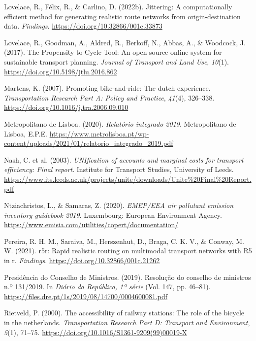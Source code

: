 \documentclass[review, doubleblind, 3p,
authoryear]{elsarticle} %
\newlength{\cslhangindent}
\newlength{\cslentryspacingunit} %
\newenvironment{CSLReferences}[2] %
 {%
  \setlength{\parindent}{0pt}
  \ifodd #1
  \let\oldpar\par
  \def\par{\hangindent=\cslhangindent\oldpar}
  \fi
  \setlength{\parskip}{#2\cslentryspacingunit}
 }%
 {}
\begin{document}
\begin{CSLReferences}{1}{0}
\leavevmode{}%
Lovelace, R., Félix, R., \& Carlino, D. (2022b). Jittering: A
computationally efficient method for generating realistic route networks
from origin-destination data. \emph{Findings}.
\url{https://doi.org/10.32866/001c.33873}

\leavevmode{}%
Lovelace, R., Goodman, A., Aldred, R., Berkoff, N., Abbas, A., \&
Woodcock, J. (2017). The Propensity to Cycle Tool: An open source online
system for sustainable transport planning. \emph{Journal of Transport
and Land Use}, \emph{10}(1). \url{https://doi.org/10.5198/jtlu.2016.862}

\leavevmode{}%
Martens, K. (2007). Promoting bike-and-ride: The dutch experience.
\emph{Transportation Research Part A: Policy and Practice},
\emph{41}(4), 326--338. \url{https://doi.org/10.1016/j.tra.2006.09.010}

\leavevmode{}%
Metropolitano de Lisboa. (2020). \emph{Relatório integrado 2019}.
{Metropolitano de Lisboa, E.P.E.}
\url{https://www.metrolisboa.pt/wp-content/uploads/2021/01/relatorio_integrado_2019.pdf}

\leavevmode{}%
Nash, C. et al. (2003). \emph{UNIfication of accounts and marginal costs
for transport efficiency: Final report}. {Institute for Transport
Studies, University of Leeds}.
\url{https://www.its.leeds.ac.uk/projects/unite/downloads/Unite\%20Final\%20Report.pdf}

\leavevmode{}%
Ntziachristos, L., \& Samaras, Z. (2020). \emph{{EMEP/EEA} air pollutant
emission inventory guidebook 2019}. Luxembourg: European Environment
Agency. \url{https://www.emisia.com/utilities/copert/documentation/}

\leavevmode{}%
Pereira, R. H. M., Saraiva, M., Herszenhut, D., Braga, C. K. V., \&
Conway, M. W. (2021). r5r: Rapid realistic routing on multimodal
transport networks with R5 in r. \emph{Findings}.
\url{https://doi.org/10.32866/001c.21262}

\leavevmode{}%
Presidência do Conselho de Ministros. (2019). Resolução do conselho de
ministros n.º 131/2019. In \emph{Diário da República, 1ª série} (Vol.
147, pp. 46--81).
\url{https://files.dre.pt/1s/2019/08/14700/0004600081.pdf}

\leavevmode{}%
Rietveld, P. (2000). The accessibility of railway stations: The role of
the bicycle in the netherlands. \emph{Transportation Research Part D:
Transport and Environment}, \emph{5}(1), 71--75.
\url{https://doi.org/10.1016/S1361-9209(99)00019-X}


\end{CSLReferences}
\end{document}
